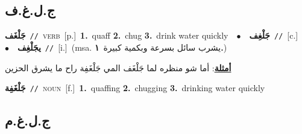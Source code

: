 \documentclass[10pt,a4paper,twoside]{article} %
\begin{document}
\begin{multicols}{2}
\vspace{-3mm}
\subsection*{\color{blue}\foreignlanguage{arabic}{ج.ل.غ.ف}\color{blue}{}} 

{\setlength\topsep{0pt}\textbf{\foreignlanguage{arabic}{جَلْغَف}}\ {\color{gray}\texttt{//}\color{black}}\ \textsc{verb}\ [p.]\ \textbf{1.}~quaff  \textbf{2.}~chug  \textbf{3.}~drink water quickly\ \ $\bullet$\ \ \setlength\topsep{0pt}\textbf{\foreignlanguage{arabic}{جَلْغِف}}\ {\color{gray}\texttt{//}\color{black}}\ [c.]\ \ $\bullet$\ \ \setlength\topsep{0pt}\textbf{\foreignlanguage{arabic}{يجَلْغِف}}\ {\color{gray}\texttt{//}\color{black}}\ [i.]\ \color{gray}(msa. \foreignlanguage{arabic}{يشرب سائل بسرعة وبكمية كبيرة}~\foreignlanguage{arabic}{\textbf{١.}})\color{black}\  \begin{flushright}\color{gray}\foreignlanguage{arabic}{\textbf{\underline{\foreignlanguage{arabic}{أمثلة}}}: أما شو منظره لما جَلْغَف المي جَلْغَفِة راح ما يشرق الحزين}\end{flushright}\color{black}} \vspace{2mm}

{\setlength\topsep{0pt}\textbf{\foreignlanguage{arabic}{جَلْغَفِة}}\ {\color{gray}\texttt{//}\color{black}}\ \textsc{noun}\ [f.]\ \textbf{1.}~quaffing  \textbf{2.}~chugging  \textbf{3.}~drinking water quickly\ } \vspace{2mm}

\vspace{-3mm}
\subsection*{\color{blue}\foreignlanguage{arabic}{ج.ل.غ.م}\color{blue}{}} 


\end{multicols}
\end{document}
